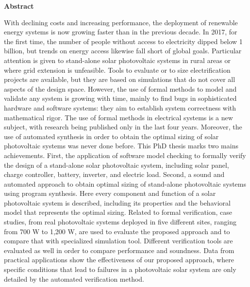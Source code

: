 \thispagestyle{plain}
\begin{center}
%    
%    
%    
    \vspace{0.9cm}
    \textbf{Abstract}
\end{center}
With declining costs and increasing performance, the deployment of renewable energy systems is now growing faster than in the previous decade. In 2017, for the first time, the number of people without access to electricity dipped below 1 billion, but trends on energy access likewise fall short of global goals. Particular attention is given to stand-alone solar photovoltaic systems in rural areas or where grid extension is unfeasible. Tools to evaluate or to size electrification projects are available, but they are based on simulations that do not cover all aspects of the design space. However, the use of formal methods to model and validate any system is growing with time, mainly to find bugs in sophisticated hardware and software systems: they aim to establish system correctness with mathematical rigor. The use of formal methods in electrical systems is a new subject, with research being published only in the last four years.
Moreover, the use of automated synthesis in order to obtain the optimal sizing of solar photovoltaic systems was never done before. This PhD thesis marks two mains achievements. First, the application of software model checking to formally verify the design of a stand-alone solar photovoltaic system, including solar panel, charge controller, battery, inverter, and electric load. Second, a sound and automated approach to obtain optimal sizing of stand-alone photovoltaic systems using program synthesis. Here every component and function of a solar photovoltaic system is described, including its properties and the behavioral model that represents the optimal sizing. Related to formal verification, case studies, from real photovoltaic systems deployed in five different sites, ranging from 700 W to 1,200 W, are used to evaluate the proposed approach and to compare that with specialized simulation tool. Different verification tools are evaluated as well in order to compare performance and soundness. Data from practical applications show the effectiveness of our proposed approach, where specific conditions that lead to failures in a photovoltaic solar system are only detailed by the automated verification method.
